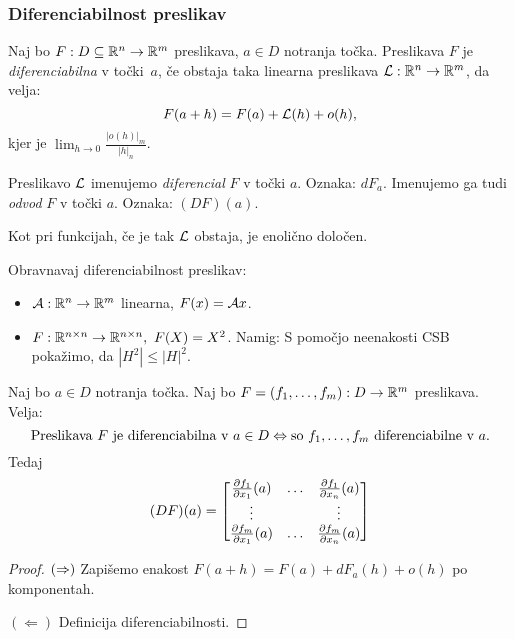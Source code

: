 \subsubsection{Diferenciabilnost preslikav}

\begin{definicija}
    Naj bo $F: D \subseteq \mathbb{R}^n \to \mathbb{R}^m$ preslikava, $a \in D$ notranja točka. Preslikava $F$ je \emph{diferenciabilna} v točki~$a$, če obstaja taka linearna preslikava $\mathcal{L}: \mathbb{R}^n \to \mathbb{R}^m$, da velja:
    $$F(a+h) = F(a) + \mathcal{L}(h) + o(h),$$
    kjer je $\lim_{h \to 0} \frac{|o(h)|_m}{|h|_n}$. 

    Preslikavo $\mathcal{L}$ imenujemo \emph{diferencial} $F$ v točki $a$. Oznaka: $dF_a$. Imenujemo ga tudi \emph{odvod} $F$ v točki $a$. Oznaka: $(DF)(a)$.
\end{definicija}

\begin{opomba}
    Kot pri funkcijah, če je tak $\mathcal{L}$ obstaja, je enolično določen.
\end{opomba}

\begin{zgled}
    Obravnavaj diferenciabilnost preslikav:
    \begin{itemize}
        \item $\mathcal{A}: \mathbb{R}^n \to \mathbb{R}^m$ linearna, $F(x) = \mathcal{A}x$.
        \item $F: \mathbb{R}^{n \times n} \to \mathbb{R}^{n \times n}, \ F(X) = X^2$.         
        Namig: S pomočjo neenakosti CSB pokažimo, da $|H^2| \leq |H|^2$.
    \end{itemize}
\end{zgled}

\begin{izrek}
    Naj bo $a \in D$ notranja točka. Naj bo $F = (f_1, \ldots, f_m): D \to \mathbb{R}^m$ preslikava. Velja: 
    $$\text{Preslikava } F \text{ je diferenciabilna v } a \in D \Leftrightarrow \text{so } f_1, \ldots, f_m \text{ diferenciabilne v } a.$$
    Tedaj
    $$(DF)(a) = \begin{bmatrix}
        \frac{\partial f_1}{\partial x_1}(a) & \ldots & \frac{\partial f_1}{\partial x_n}(a) \\
        \vdots & & \vdots \\
        \frac{\partial f_m}{\partial x_1}(a) & \ldots & \frac{\partial f_m}{\partial x_n}(a) 
    \end{bmatrix}$$
\end{izrek}

\begin{proof}
    $(\Rightarrow)$ Zapišemo enakost $F(a+h) = F(a) + dF_a(h) + o(h)$ po komponentah.

    $(\Leftarrow)$ Definicija diferenciabilnosti.
\end{proof}

